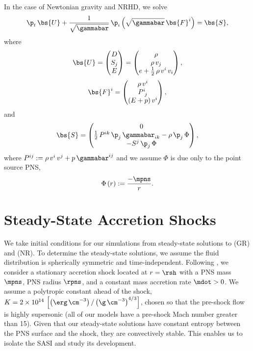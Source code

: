 In the case of Newtonian gravity and NRHD, we solve\begin{equation}
  \p_{t}\,\bs{U}
  +\frac{1}{\sqrt{\gammabar}}\,
  \p_{i}\left(\sqrt{\gammabar}\,\bs{F}^{i}\right)=\bs{S},
  \label{eq.cLawsNR}
\end{equation}
where
\begin{equation}
  \bs{U}
  =\begin{pmatrix}
  D\\
  S_{j}\\
  E
  \end{pmatrix}
  =\begin{pmatrix}
  \rho\\
  \rho\,v_{j}\\
  e+\frac{1}{2}\,\rho\,v^{i}\,v_{i}
  \end{pmatrix},
\end{equation}
\begin{equation}
  \bs{F}^{i}
  =\begin{pmatrix}
  \rho\,v^{i}\\
  P^{i}_{~j}\\
  \left(E+p\right)v^{i}
  \end{pmatrix},
\end{equation}
and
\begin{equation}
  \bs{S}
  =\begin{pmatrix}
  0\\
  \frac{1}{2}\,P^{ik}\,\p_{j}\,\gammabar_{ik}
  -\rho\,\p_{j}\,\Phi\\
  -S^{j}\,\p_{j}\,\Phi
  \end{pmatrix},
\end{equation}
where
$P^{ij}:=\rho\,v^{i}\,v^{j}+p\,\gammabar^{ij}$ and we assume $\Phi$
is due only to the point source PNS,
\begin{equation}
  \Phi\left(r\right):=\frac{-\mpns}{r}.
\end{equation}

\section{Steady-State Accretion Shocks}
\label{ss.ssas}

We take initial conditions for our simulations from steady-state
solutions to  (GR) and  (NR).
To determine the steady-state solutions,
we assume the fluid distribution is spherically symmetric and time-independent.
Following \citet{bmd2003},
we consider a stationary accretion shock located at $r=\rsh$
with a PNS mass $\mpns$, PNS radius $\rpns$,
and a constant mass accretion rate
$\mdot>0$.
We assume a polytropic constant ahead of the shock, $K=2\times10^{14}\,
\left[\left(\erg\,\cm^{-3}\right)/\left(\g\,\cm^{-3}\right)^{4/3}\right]$,
chosen so that the pre-shock flow is highly supersonic
(all of our models have a pre-shock Mach number greater than 15).
Given that our steady-state solutions have constant
entropy between the PNS surface and the shock, they are convectively stable.
This enables us to isolate the SASI and study its development.

